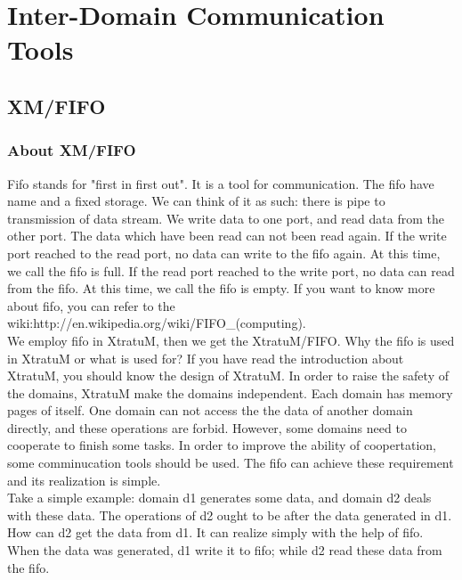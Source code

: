 \section{Inter-Domain Communication Tools}
\subsection{XM/FIFO}
\subsubsection{About XM/FIFO}
Fifo stands for "first in first out". It is a tool for communication. The fifo have name and a fixed storage. We can think of it as such: there is pipe to transmission of data stream. We write data to one port, and read data from the other port. The data which have been read can not been read again. If the write port reached to the read port, no data can write to the fifo again. At this time, we call the fifo is full. If the read port reached to the write port, no data can read from the fifo. At this time, we call the fifo is empty. If you want to know more about fifo, you can refer to the wiki:http://en.wikipedia.org/wiki/FIFO\_(computing). 
\\
We employ fifo in XtratuM, then we get the XtratuM/FIFO. Why the fifo is used in XtratuM or what is used for? If you have read the introduction about XtratuM, you should know the design of XtratuM. In order to raise the safety of the domains, XtratuM make the domains independent. Each domain has memory pages of itself. One domain can not access the the data of another domain directly, and these operations are forbid. However, some domains need to cooperate to finish some tasks. In order to improve the ability of coopertation, some comminucation tools should be used. The fifo can achieve these requirement and its realization is simple. 
\\
Take a simple example: domain d1 generates some data, and domain d2 deals with these data. The operations of d2 ought to be after the data generated in d1. How can d2 get the data from d1. It can realize simply with the help of fifo. When the data was generated, d1 write it to fifo; while d2 read these data from the fifo.
